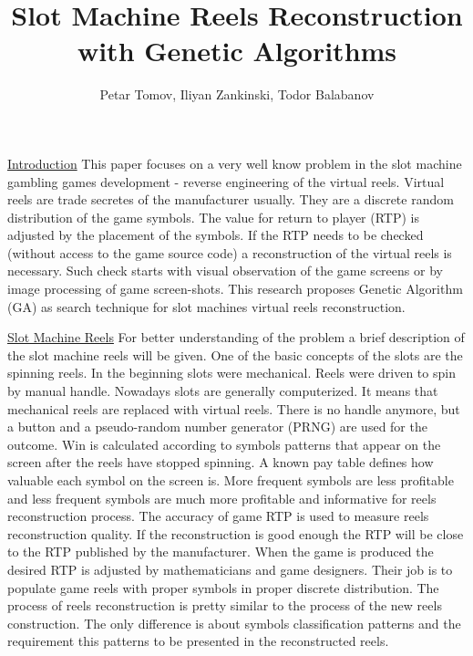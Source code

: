 \documentclass{article}
\title{Slot Machine Reels Reconstruction with Genetic Algorithms}
\author{Petar Tomov, Iliyan Zankinski, Todor Balabanov}
\begin{document}
%
\maketitle

\underline{Introduction} This paper focuses on a very well know problem in the slot machine gambling games development - reverse engineering of the virtual reels. Virtual reels are trade secretes of the manufacturer usually. They are a discrete random distribution of the game symbols. The value for return to player (RTP) is adjusted by the placement of the symbols. If the RTP needs to be checked (without access to the game source code) a reconstruction of the virtual reels is necessary. Such check starts with visual observation of the game screens or by image processing of game screen-shots. This research proposes Genetic Algorithm (GA) as search technique for slot machines virtual reels reconstruction.
\vspace*{3mm}

\underline{Slot Machine Reels} For better understanding of the problem a brief description of the slot machine reels will be given. One of the basic concepts of the slots are the spinning reels. In the beginning slots were mechanical. Reels were driven to spin by manual handle. Nowadays slots are generally computerized. It means that mechanical reels are replaced with virtual reels. There is no handle anymore, but a button and a pseudo-random number generator (PRNG) are used for the outcome. Win is calculated according to symbols patterns that appear on the screen after the reels have stopped spinning. A known pay table defines how valuable each symbol on the screen is. More frequent symbols are less profitable and less frequent symbols are much more profitable and informative for reels reconstruction process. The accuracy of game RTP is used to measure reels reconstruction quality. If the reconstruction is good enough the RTP will be close to the RTP published by the manufacturer. When the game is produced the desired RTP is adjusted by mathematicians and game designers. Their job is to populate game reels with proper symbols in proper discrete distribution. The process of reels reconstruction is pretty similar to the process of the new reels construction. The only difference is about symbols classification patterns and the requirement this patterns to be presented in the reconstructed reels.
\vspace*{3mm}
\end{document}
